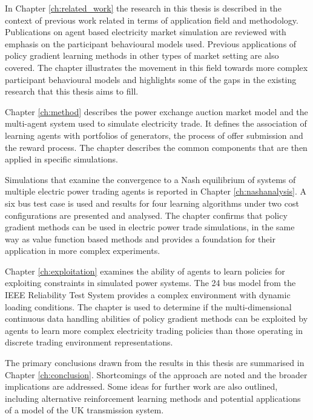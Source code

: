 In Chapter \ref{ch:related_work} the research in this thesis is described in the
context of previous work related in terms of application field and
methodology.  Publications on agent based electricity market simulation are
reviewed with emphasis on the participant behavioural models used. Previous
applications of policy gradient learning methods in other types of market
setting are also covered.  The chapter illustrates the movement in this field
towards more complex participant behavioural models and highlights some of the
gaps in the existing research that this thesis aims to fill.

Chapter \ref{ch:method} describes the power exchange auction market model and
the multi-agent system used to simulate electricity trade.  It defines the
association of learning agents with portfolios of generators, the process of
offer submission and the reward process. The chapter describes the common
components that are then applied in specific simulations.

Simulations that examine the convergence to a Nash equilibrium of systems of
multiple electric power trading agents is reported in Chapter
\ref{ch:nashanalysis}. A six bus test case is used and results for four learning
algorithms under two cost configurations are presented and analysed. The chapter
confirms that policy gradient methods can be used in electric power trade
simulations, in the same way as value function based methods and provides a
foundation for their application in more complex experiments.

Chapter \ref{ch:exploitation} examines the ability of agents to learn policies
for exploiting constraints in simulated power systems.  The 24 bus model from
the IEEE Reliability Test System provides a complex environment with dynamic
loading conditions. The chapter is used to determine if the multi-dimensional
continuous data handling abilities of policy gradient methods can be exploited
by agents to learn more complex electricity trading policies than those
operating in discrete trading environment representations.

The primary conclusions drawn from the results in this thesis are summarised
in Chapter \ref{ch:conclusion}.  Shortcomings of the approach are noted and
the broader implications are addressed.  Some ideas for further work are also
outlined, including alternative reinforcement learning methods and potential
applications of a model of the UK transmission system.

